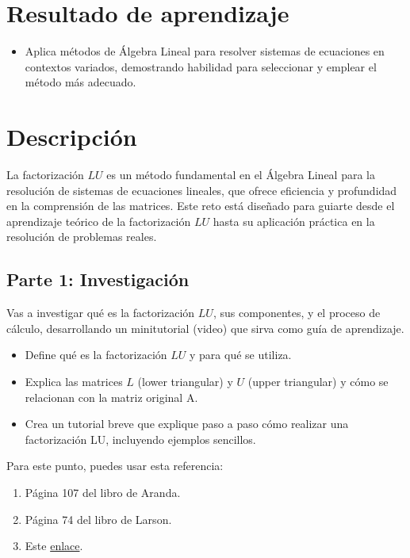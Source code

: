 \documentclass[a4,11pt]{aleph-notas}
\begin{document}
\encabezado

\section{Resultado de aprendizaje}

\begin{itemize}
\item 
    Aplica métodos de Álgebra Lineal para resolver sistemas de ecuaciones en contextos variados, demostrando habilidad para seleccionar y emplear el método más adecuado.
\end{itemize}


\section{Descripción}

La factorización $LU$ es un método fundamental en el Álgebra Lineal para la resolución de sistemas de ecuaciones lineales, que ofrece eficiencia y profundidad en la comprensión de las matrices. Este reto está diseñado para guiarte desde el aprendizaje teórico de la factorización $LU$ hasta su aplicación práctica en la resolución de problemas reales.

\subsection{Parte 1: Investigación}

Vas a investigar qué es la factorización $LU$, sus componentes, y el proceso de cálculo, desarrollando un minitutorial (video) que sirva como guía de aprendizaje.

\begin{itemize}
\item
    Define qué es la factorización $LU$ y para qué se utiliza.
\item
    Explica las matrices $L$ (lower triangular) y $U$ (upper triangular) y cómo se relacionan con la matriz original A.
\item
    Crea un tutorial breve que explique paso a paso cómo realizar una factorización LU, incluyendo ejemplos sencillos.
\end{itemize}

Para este punto, puedes usar esta referencia: 
\begin{enumerate}
    \item Página 107 del libro de Aranda.
    \item Página 74 del libro de Larson.
    \item Este \href{https://espanol.libretexts.org/Matematicas/Algebra_lineal/Un_Primer_Curso_de_%C3%81lgebra_Lineal_(Kuttler)/02%3A_Matrices/2.10%3A_Factorizaci%C3%B3n_LU}{enlace}.
\end{enumerate}
\end{document}
